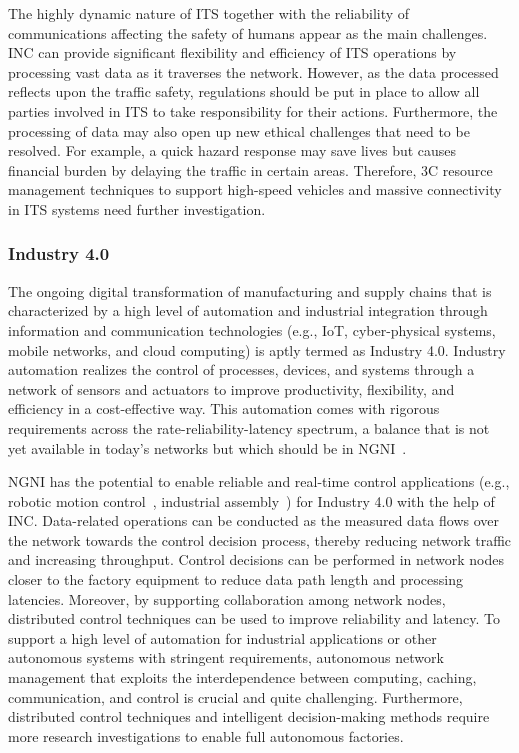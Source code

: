 The highly dynamic nature of ITS together with the reliability of communications affecting the safety of humans appear as the main challenges.  INC can provide significant flexibility and efficiency of ITS operations by processing vast data as it traverses the network.  However, as the data processed reflects upon the traffic safety, regulations should be put in place to allow all parties involved in ITS to take responsibility for their actions.  Furthermore, the processing of data may also open up new ethical challenges that need to be resolved.  For example, a quick hazard response may save lives but causes financial burden by delaying the traffic in certain areas.  Therefore, 3C resource management techniques to support high-speed vehicles and massive connectivity in ITS systems need further investigation. 
 
 \subsubsection{Industry 4.0} 
 
\noindent The ongoing digital transformation of manufacturing and supply chains that is characterized by a high level of automation and industrial integration through information and communication technologies (e.g., IoT, cyber-physical systems, mobile networks, and cloud computing) is aptly termed as Industry 4.0. Industry automation realizes the control of processes, devices, and systems through a network of sensors and actuators to improve productivity, flexibility, and efficiency in a cost-effective way. This automation comes with rigorous requirements across the rate-reliability-latency spectrum, a balance that is not yet available in today’s networks but which should be in NGNI~\cite{8869705,9178307}. 

NGNI has the potential to enable reliable and real-time control applications (e.g., robotic motion control~\cite{9293092}, industrial assembly~\cite{9468247}) for Industry 4.0 with the help of INC. Data-related operations can be conducted as the measured data flows over the network towards the control decision process, thereby reducing network traffic and increasing throughput.  Control decisions can be performed in network nodes closer to the factory equipment to reduce data path length and processing latencies. Moreover, by supporting collaboration among network nodes, distributed control techniques can be used to improve reliability and latency.  To support a high level of automation for industrial applications or other autonomous systems with stringent requirements, autonomous network management that exploits the interdependence between computing, caching, communication, and control is crucial and quite challenging. Furthermore, distributed control techniques and intelligent decision-making methods require more research investigations to enable full autonomous factories.
 

